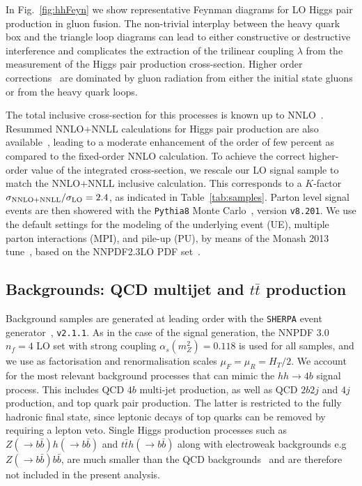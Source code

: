 In Fig.~\ref{fig:hhFeyn} we show representative Feynman diagrams
    for LO Higgs pair production in gluon fusion.
    The non-trivial interplay between the heavy quark box and the triangle loop diagrams
    can lead to either constructive or destructive interference
    and complicates the extraction of
    the trilinear coupling
    $\lambda$ from the measurement of the Higgs pair
    production cross-section.
    Higher order corrections~\cite{deFlorian:2013jea,Frederix:2014hta}
    are dominated by gluon radiation
    from either the initial state gluons or from the heavy quark loops.

    The total inclusive cross-section for this processes is
    known up to NNLO~\cite{deFlorian:2013jea}.
    Resummed NNLO+NNLL calculations for Higgs pair production are
    also available~\cite{deFlorian:2015moa},
leading to a moderate enhancement of the order of
few percent as compared to the fixed-order NNLO calculation.
%
To achieve the correct higher-order value of the
integrated cross-section, we rescale our LO signal sample to match the
NNLO+NNLL
inclusive calculation.
%
This corresponds to
a $K$-factor $\sigma_{\rm NNLO+NNLL}/\sigma_{\rm LO}=2.4$, as indicated
in Table~\ref{tab:samples}.
%
Parton level signal events are then showered with the {\tt Pythia8} Monte
Carlo~\cite{Sjostrand:2007gs,Sjostrand:2014zea}, version {\tt v8.201}.
%
We use the default settings for the modeling
of the underlying event (UE), multiple parton
interactions (MPI), and pile-up (PU), by means
of the Monash 2013 tune~\cite{Skands:2014pea},
based on the NNPDF2.3LO PDF set~\cite{Ball:2012cx,Ball:2013hta}.
%


\subsection{Backgrounds: QCD multijet and $t\bar{t}$ production}

Background samples are generated at leading order
with the {\tt SHERPA} event generator~\cite{Gleisberg:2008ta}, {\tt v2.1.1}.
%
As in the case of the signal generation,
the NNPDF 3.0 $n_f = 4$ LO set with strong coupling
$\alpha_s(m_Z^2)=0.118$ is used for all samples, and
we use as
factorisation and renormalisation scales $\mu_F=\mu_R=H_T/2$.
%
We account for the most relevant background
processes that can mimic the
 $hh\to 4b$ signal process.
%
This includes  QCD $4b$ multi-jet production, as well as
QCD $2b2j$ and $4j$ production, and top quark pair
production.
%
The latter is restricted to the fully hadronic final state,
since 
leptonic decays of top quarks can be removed by requiring
a lepton veto.
%
Single Higgs production processes such as $Z(\to b\bar{b})h(\to b\bar{b})$
and $t\bar{t}h(\to b\bar{b})$ along with electroweak backgrounds e.g $Z(\to b\bar{b})b\bar{b}$,
are much smaller than the QCD backgrounds~\cite{Wardrope:2014kya,deLima:2014dta}
and are therefore not included in the present analysis.
%



